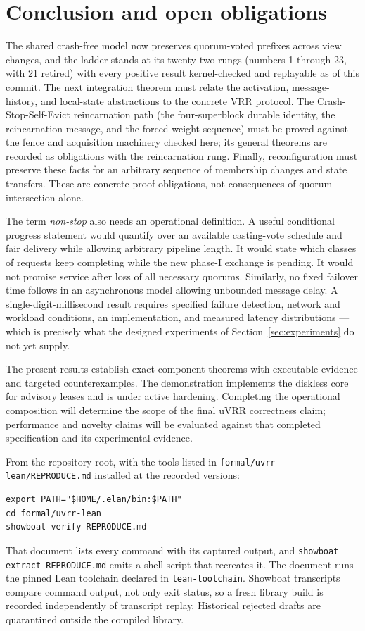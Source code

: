 \documentclass[10pt,journal,letterpaper]{IEEEtran}
\newcommand{\code}[1]{\texttt{\small #1}}
\begin{document}
\section{Conclusion and open obligations}\label{sec:conclusion}
The shared crash-free model now preserves quorum-voted prefixes across
view changes, and the ladder stands at its twenty-two rungs (numbers 1
through 23, with 21 retired) with every
positive result kernel-checked and replayable as of this commit. The next
integration theorem must relate the activation,
message-history, and local-state abstractions to the concrete VRR protocol. The Crash-Stop-Self-Evict reincarnation path (the four-superblock durable
identity, the reincarnation message, and the forced weight sequence) must be
proved against the fence and acquisition machinery checked here; its general
theorems are recorded as obligations with the reincarnation rung. Finally,
reconfiguration must preserve these facts for an arbitrary sequence of
membership changes and state transfers. These are concrete proof obligations,
not consequences of quorum intersection alone.

The term \emph{non-stop} also needs an operational definition. A useful
conditional progress statement would quantify over an available casting-vote
schedule and fair delivery while allowing arbitrary pipeline length. It would
state which classes of requests keep completing while the new phase-I
exchange is pending. It would not promise service after loss of all necessary
quorums. Similarly, no fixed failover time follows in an asynchronous model
allowing unbounded message delay. A single-digit-millisecond result requires
specified failure detection, network and workload conditions, an implementation,
and measured latency distributions --- which is precisely what the designed
experiments of Section~\ref{sec:experiments} do not yet supply.

The present results establish exact component theorems with executable
evidence and targeted counterexamples. The demonstration implements the
diskless core for advisory leases and is under active hardening. Completing
the operational composition will determine the scope of the final uVRR
correctness claim; performance and novelty claims will be evaluated against
that completed specification and its experimental evidence.

From the repository root, with the tools listed in
\code{formal/uvrr-lean/REPRODUCE.md} installed at the recorded versions:
\begin{verbatim}
export PATH="$HOME/.elan/bin:$PATH"
cd formal/uvrr-lean
showboat verify REPRODUCE.md
\end{verbatim}
That document lists every command with its captured output, and
\code{showboat extract REPRODUCE.md} emits a shell script that recreates it.
The document runs the pinned Lean toolchain declared in
\code{lean-toolchain}. Showboat transcripts compare command output, not only
exit status, so a fresh library build is recorded independently of transcript
replay. Historical rejected drafts are quarantined outside the compiled
library.
\end{document}
